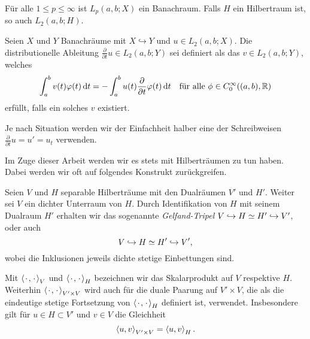 \begin{Lemma}
\label{lem:gl:br:bochner_ist_banachraum}
    Für alle $1 \leq p \leq \infty$ ist $L_{p}(a, b; X)$ ein Banachraum.
    Falls $H$ ein Hilbertraum ist, so auch $L_{2}(a, b; H)$.
\end{Lemma}

\begin{Definition}
\label{def:gl:br:schwache_zeitableitung}
    Seien $X$ und $Y$ Banachräume mit $X \hookrightarrow Y$ und $u \in L_{2}(a, b; X)$.
    Die distributionelle Ableitung $\frac{\partial}{\partial t} u \in L_{2}(a, b; Y)$ sei definiert als das $v \in L_{2}(a, b; Y)$, welches
    \begin{equation}
        \int_{a}^{b} v(t) \varphi(t) \diff t = - \int_{a}^{b} u(t) \frac{\partial}{\partial t} \varphi(t) \diff t \quad \fa \phi \in C^{\infty}_{0}((a, b), \mathbb{R})
    \end{equation}
    erfüllt, falls ein solches $v$ existiert.
\end{Definition}

\begin{Bemerkung}
    Je nach Situation werden wir der Einfachheit halber eine der Schreibweisen $\frac{\partial}{\partial t} u = u' = u_{t}$ verwenden.
\end{Bemerkung}

Im Zuge dieser Arbeit werden wir es stets mit Hilberträumen zu tun haben.
Dabei werden wir oft auf folgendes Konstrukt zurückgreifen.

\begin{Definition}
\label{def:gl:br:gelfand_tripel}
    Seien $V$ und $H$ separable Hilberträume mit den Dualräumen $V'$ und $H'$.
    Weiter sei $V$ ein dichter Unterraum von $H$.
    Durch Identifikation von $H$ mit seinem Dualraum $H'$ erhalten wir das sogenannte \emph{Gelfand-Tripel} $V \denseinclusion H \simeq H' \denseinclusion V'$, oder auch
    \begin{equation}
        V \denseinclusion H \simeq H' \denseinclusion V',
    \end{equation}
    wobei die Inklusionen jeweils dichte stetige Einbettungen sind.
\end{Definition}

\begin{Bemerkung}
    Mit $\skprod{\blank}{\blank}_{V}$ und $\skprod{\blank}{\blank}_{H}$ bezeichnen wir das Skalarprodukt auf $V$ respektive $H$.
    Weiterhin $\skprod{\blank}{\blank}_{V' \times V}$ wird auch für die duale Paarung auf $V' \times V$, die als die eindeutige stetige Fortsetzung von $\skprod{\blank}{\blank}_{H}$ definiert ist, verwendet.
    Insbesondere gilt für $u \in H \subset V'$ und $v \in V$ die Gleichheit
    \begin{equation}
        \skprod{u}{v}_{V' \times V} = \skprod{u}{v}_{H}.
    \end{equation}
\end{Bemerkung}

